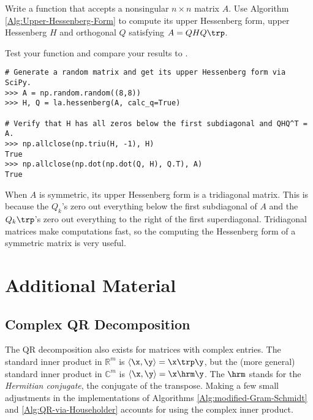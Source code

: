 \begin{problem} %
Write a function that accepts a nonsingular $n \times n$ matrix $A$.
Use Algorithm \ref{Alg:Upper-Hessenberg-Form} to compute its upper Hessenberg form, upper Hessenberg $H$ and orthogonal $Q$ satisfying $A = QHQ\trp$.

Test your function and compare your results to .

\begin{lstlisting}
# Generate a random matrix and get its upper Hessenberg form via SciPy.
>>> A = np.random.random((8,8))
>>> H, Q = la.hessenberg(A, calc_q=True)

# Verify that H has all zeros below the first subdiagonal and QHQ^T = A.
>>> np.allclose(np.triu(H, -1), H)
True
>>> np.allclose(np.dot(np.dot(Q, H), Q.T), A)
True
\end{lstlisting}
\label{prob:hessenberg-via-householder}
\end{problem}

\begin{info}
When $A$ is symmetric, its upper Hessenberg form is a tridiagonal matrix.
This is because the $Q_k$'s zero out everything below the first subdiagonal of $A$ and the $Q_k\trp$'s zero out everything to the right of the first superdiagonal.
Tridiagonal matrices make computations fast, so the computing the Hessenberg form of a symmetric matrix is very useful.
\end{info}

\newpage

\section*{Additional Material} %

\subsection*{Complex QR Decomposition} %

The QR decomposition also exists for matrices with complex entries.
The standard inner product in $\mathbb{R}^m$ is $\langle \x,\y \rangle = \x\trp \y$, but the (more general) standard inner product in $\mathbb{C}^m$ is $\langle \x,\y \rangle = \x\hrm \y$.
The $\hrm$ stands for the \emph{Hermitian conjugate}, the conjugate of the transpose.
Making a few small adjustments in the implementations of Algorithms \ref{Alg:modified-Gram-Schmidt} and \ref{Alg:QR-via-Householder} accounts for using the complex inner product.

